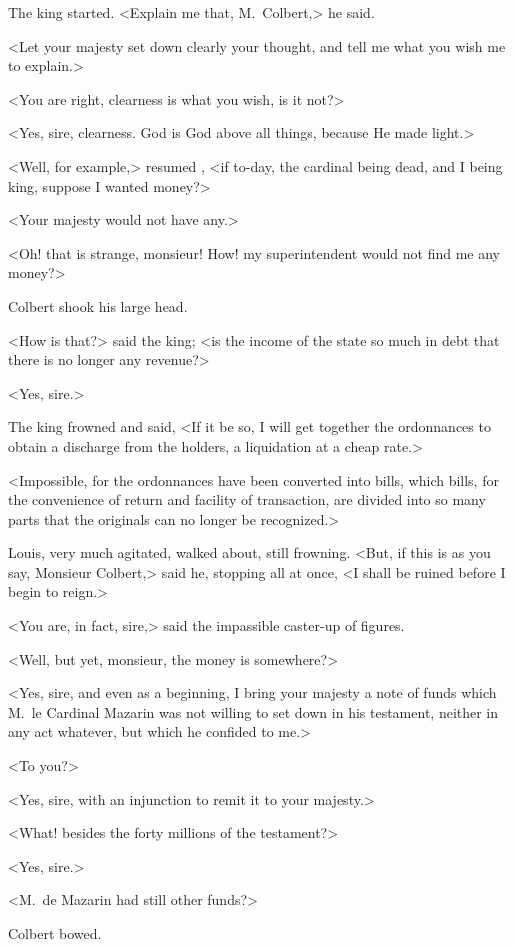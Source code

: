The king started. <Explain me that, M.~Colbert,> he said.

<Let your majesty set down clearly your thought, and tell me what you wish me to explain.>

<You are right, clearness is what you wish, is it not?>

<Yes, sire, clearness. God is God above all things, because He made light.>

<Well, for example,> resumed , <if to-day, the cardinal being dead, and I being king, suppose I wanted money?>

<Your majesty would not have any.>

<Oh! that is strange, monsieur! How! my superintendent would not find me any money?>

Colbert shook his large head.

<How is that?> said the king; <is the income of the state so much in debt that there is no longer any revenue?>

<Yes, sire.>

The king frowned and said, <If it be so, I will get together the ordonnances to obtain a discharge from the holders, a liquidation at a cheap rate.>

<Impossible, for the ordonnances have been converted into bills, which bills, for the convenience of return and facility of transaction, are divided into so many parts that the originals can no longer be recognized.>

Louis, very much agitated, walked about, still frowning. <But, if this is as you say, Monsieur Colbert,> said he, stopping all at once, <I shall be ruined before I begin to reign.>

<You are, in fact, sire,> said the impassible caster-up of figures.

<Well, but yet, monsieur, the money is somewhere?>

<Yes, sire, and even as a beginning, I bring your majesty a note of funds which M.~le Cardinal Mazarin was not willing to set down in his testament, neither in any act whatever, but which he confided to me.>

<To you?>

<Yes, sire, with an injunction to remit it to your majesty.>

<What! besides the forty millions of the testament?>

<Yes, sire.>

<M.~de Mazarin had still other funds?>

Colbert bowed.

